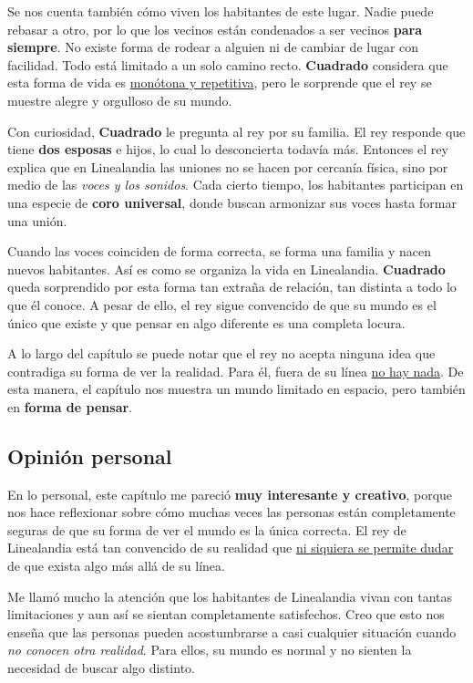 \documentclass{article}
\begin{document}
Se nos cuenta también cómo viven los habitantes de este lugar. Nadie puede rebasar a otro, por lo que los vecinos están condenados a ser vecinos \textbf{para siempre}. No existe forma de rodear a alguien ni de cambiar de lugar con facilidad. Todo está limitado a un solo camino recto. \textbf{Cuadrado} considera que esta forma de vida es \underline{monótona y repetitiva}, pero le sorprende que el rey se muestre alegre y orgulloso de su mundo.

Con curiosidad, \textbf{Cuadrado} le pregunta al rey por su familia. El rey responde que tiene \textbf{dos esposas} e hijos, lo cual lo desconcierta todavía más. Entonces el rey explica que en Linealandia las uniones no se hacen por cercanía física, sino por medio de las \emph{voces y los sonidos}. Cada cierto tiempo, los habitantes participan en una especie de 
\textcolor{Cerulean}{\textbf{coro universal}}, donde buscan armonizar sus voces hasta formar una unión.

Cuando las voces coinciden de forma correcta, se forma una familia y nacen nuevos habitantes. Así es como se organiza la vida en Linealandia. \textbf{Cuadrado} queda sorprendido por esta forma tan extraña de relación, tan distinta a todo lo que él conoce. A pesar de ello, el rey sigue convencido de que su mundo es el único que existe y que pensar en algo diferente es una completa locura.

A lo largo del capítulo se puede notar que el rey no acepta ninguna idea que contradiga su forma de ver la realidad. Para él, fuera de su línea \underline{no hay nada}. De esta manera, el capítulo nos muestra un mundo limitado en espacio, pero también en \textbf{forma de pensar}.

\subsection*{Opinión personal}

En lo personal, este capítulo me pareció \textbf{muy interesante y creativo}, porque nos hace reflexionar sobre cómo muchas veces las personas están completamente seguras de que su forma de ver el mundo es la única correcta. El rey de Linealandia está tan convencido de su realidad que \underline{ni siquiera se permite dudar} de que exista algo más allá de su línea.

Me llamó mucho la atención que los habitantes de Linealandia vivan con tantas limitaciones y aun así se sientan completamente satisfechos. Creo que esto nos enseña que las personas pueden acostumbrarse a casi cualquier situación cuando \emph{no conocen otra realidad}. Para ellos, su mundo es normal y no sienten la necesidad de buscar algo distinto.
\end{document}
